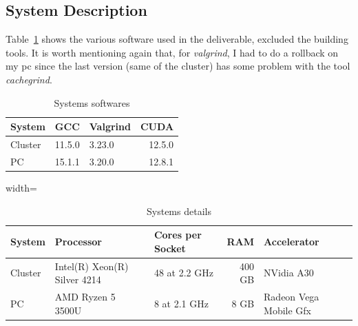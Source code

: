 \documentclass[conference]{IEEEtran}
\begin{document}
\subsection{System Description}


Table~\ref{tab:systems_softwares} shows the various software used in the deliverable, excluded the building tools. It is worth mentioning again that, for \emph{valgrind}, I had to do a rollback on my pc since the last version (same of the cluster) has some problem with the tool \emph{cachegrind}. 

\begin{table}[ht]
    \centering
    \begin{tabular}{lllr}
    \toprule
    \textbf{System} &  \textbf{GCC} & \textbf{Valgrind} & \textbf{CUDA}\\
    \midrule
    Cluster &  11.5.0 & 3.23.0 & 12.5.0\\
    PC &  15.1.1 & 3.20.0 & 12.8.1\\
    \bottomrule
    \end{tabular}
    \vspace{.5em}
    
    \caption{Systems softwares}
    \label{tab:systems_softwares}
\end{table}

\begin{table}[ht]
    \centering
    \begin{adjustbox}{width=\columnwidth}
    \begin{tabular}{lllrl}
    \toprule
    \textbf{System} &  \textbf{Processor} & \textbf{Cores per Socket} & \textbf{RAM} & \textbf{Accelerator} \\
    \midrule
    Cluster &  Intel(R) Xeon(R) Silver 4214 & 48 at 2.2 GHz & 400 GB & NVidia A30\\
    PC &  AMD Ryzen 5 3500U & 8 at 2.1 GHz & 8 GB & Radeon Vega Mobile Gfx \\
    \bottomrule
    \end{tabular}
    \end{adjustbox}
    \vspace{.5em}
    
    \caption{Systems details}
    \label{tab:systems_detals}
\end{table}
\end{document}
